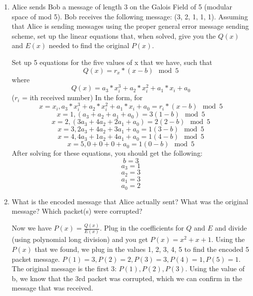 \question \begin{enumerate}[label=(\alph*)]
\item Alice sends Bob a message of length 3 on the Galois Field of 
5 (modular space of mod 5). Bob receives the following message: 
(3, 2, 1, 1, 1). Assuming that Alice is sending messages using the 
proper general error message sending scheme, set up the linear equations 
that, when solved, give you the $Q(x)$ and $E(x)$ needed to find the 
original $P(x)$.
\begin{solution}[3in]
Set up 5 equations for the five values of x that we have, such that 
\[Q(x) = r_{x}*(x-b) \mod 5\] 
where 
\[Q(x)= a_3*x_i^3 + a_2*x_i^2 + a_1*x_i + a_0\]
($r_i$ = ith received number)\newline
In the form, for 
\[x = x_i, a_3*x_i^3 + a_2*x_i^2 + a_1*x_i + a_0 = r_i*(x - b)\mod 5\]
\[x=1, (a_3 + a_2 + a_1 + a_0) = 3(1 - b) \mod 5\]
\[x=2, (3a_3 + 4a_2 + 2a_1 + a_0) = 2(2 -b) \mod 5\]
\[x=3, 2a_3 + 4a_2 + 3a_1 + a_0 =  1(3 - b) \mod 5\]
\[x=4,  4a_3 + 1a_2 + 4a_1 + a_0 =  1(4 - b) \mod 5\]
\[x=5, 0 + 0 + 0 + a_0 = 1(0 - b) \mod 5\]
After solving for these equations, you should get the following:
\[b = 3\]
\[a_3 = 1\]
\[a_2 = 3\]
\[a_1 = 3\]
\[a_0 = 2\]
\end{solution}
\item What is the encoded message that Alice actually sent? What was the 
original message? Which packet(s) were corrupted?
\begin{solution}[2 in]
Now we have $P(x) = \frac{Q(x)}{E(x)}$. Plug in the coefficients for 
$Q$ and $E$ and divide (using polynomial long division) and you get 
$P(x) = x^2 + x + 1$.
Using the $P(x)$ that we found, we plug in the values 1, 2, 3, 4, 5 
to find the encoded 5 packet message. $P(1) = 3, P(2) = 2, P(3) = 3, 
P(4) = 1, P(5) = 1$. The original message is the first 3: $P(1), P(2), 
P(3)$. Using the value of b, we know that the 3rd packet was corrupted, 
which we can confirm in the message that was received.
\end{solution}
\end{enumerate}